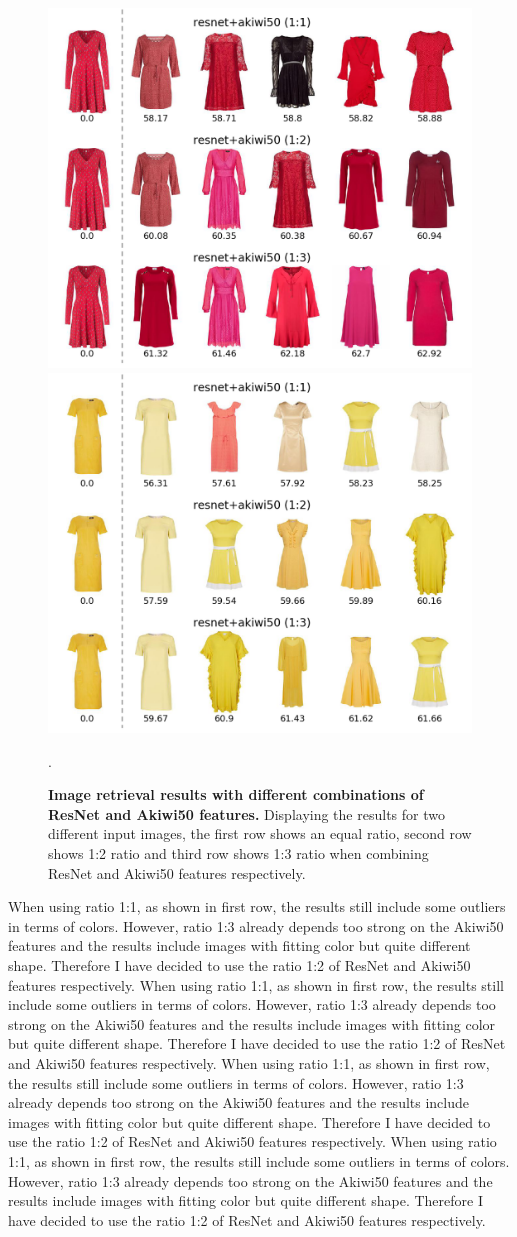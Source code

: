 \documentclass[12pt]{report}
\begin{document}
\begin{figure}[!h]
\centering
{\includegraphics[width=.48\linewidth]{04_experiments/retrieval/resnet_red}}\hspace{0.2cm}
{\includegraphics[width=.48\linewidth]{04_experiments/retrieval/resnet_yellow}}
\caption{\label{fig:search_weights} \textbf{Image retrieval results with different combinations of ResNet and Akiwi50 features.} Displaying the results for two different input images, the first row shows an equal ratio, second row shows 1:2 ratio and third row shows 1:3 ratio when combining ResNet and Akiwi50 features respectively.}.
\end{figure}

When using ratio 1:1, as shown in first row, the results still include some outliers in terms of colors. However, ratio 1:3 already depends too strong on the Akiwi50 features and the results include images with fitting color but quite different shape. Therefore I have decided to use the ratio 1:2 of ResNet and Akiwi50 features respectively.
When using ratio 1:1, as shown in first row, the results still include some outliers in terms of colors. However, ratio 1:3 already depends too strong on the Akiwi50 features and the results include images with fitting color but quite different shape. Therefore I have decided to use the ratio 1:2 of ResNet and Akiwi50 features respectively.
When using ratio 1:1, as shown in first row, the results still include some outliers in terms of colors. However, ratio 1:3 already depends too strong on the Akiwi50 features and the results include images with fitting color but quite different shape. Therefore I have decided to use the ratio 1:2 of ResNet and Akiwi50 features respectively.
When using ratio 1:1, as shown in first row, the results still include some outliers in terms of colors. However, ratio 1:3 already depends too strong on the Akiwi50 features and the results include images with fitting color but quite different shape. Therefore I have decided to use the ratio 1:2 of ResNet and Akiwi50 features respectively.
\end{document}
